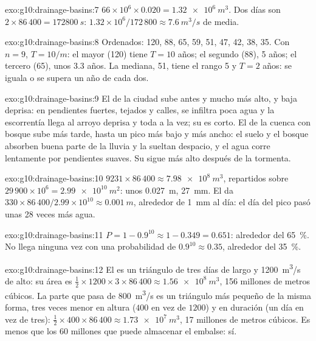 \begin{solution}{exo:g10:drainage-basins:7}
$66 \times 10^6 \times 0.020 = \qty{1.32e6}{m^3}$. Dos días son
$2 \times 86\,400 = \qty{172800}{s}$: $1.32 \times 10^6/172\,800 \approx
\qty{7.6}{m^3/s}$ de media.
\end{solution}

\begin{solution}{exo:g10:drainage-basins:8}
Ordenados: 120, 88, 65, 59, 51, 47, 42, 38, 35. Con $n = 9$, $T = 10/m$: el
mayor (120) tiene $T = 10$ años; el segundo (88), 5 años; el tercero (65),
unos 3.3 años. La mediana, 51, tiene el rango 5 y $T = 2$ años: se iguala o
se supera un año de cada dos.
\end{solution}

\begin{solution}{exo:g10:drainage-basins:9}
El  de la ciudad sube antes y mucho más alto, y baja deprisa: en
pendientes fuertes, tejados y calles, se infiltra poca agua y la escorrentía
llega al arroyo deprisa y toda a la vez; su  es corto. El
 de la cuenca con bosque sube más tarde, hasta un pico más bajo y
más ancho: el suelo y el bosque absorben buena parte de la lluvia y la
sueltan despacio, y el agua corre lentamente por pendientes suaves. Su  sigue más alto después de la tormenta.
\end{solution}

\begin{solution}{exo:g10:drainage-basins:10}
$9231 \times 86\,400 \approx \qty{7.98e8}{m^3}$, repartidos sobre
$29\,900 \times 10^6 = \qty{2.99e10}{m^2}$: unos \qty{0.027}{m},
\qty{27}{mm}. El  da $330 \times 86\,400/2.99 \times 10^{10}
\approx \qty{0.001}{m}$, alrededor de \qty{1}{mm} al día: el día del pico
pasó unas 28 veces más agua.
\end{solution}

\begin{solution}{exo:g10:drainage-basins:11}
$P = 1 - 0.9^{10} \approx 1 - 0.349 = 0.651$: alrededor del
\qty{65}{\percent}. No llega ninguna vez con una probabilidad de $0.9^{10} \approx 0.35$, alrededor del \qty{35}{\percent}.
\end{solution}

\begin{solution}{exo:g10:drainage-basins:12}
El  es un triángulo de tres días de largo y \qty{1200}{m^3/s} de
alto: su área es $\tfrac12 \times 1200 \times 3 \times 86\,400 \approx
\qty{1.56e8}{m^3}$, \num{156} millones de metros cúbicos. La parte que pasa
de \qty{800}{m^3/s} es un triángulo más pequeño de la misma forma, tres veces
menor en altura ($400$ en vez de $1200$) y en duración (un día en vez de
tres): $\tfrac12 \times 400 \times 86\,400 \approx \qty{1.73e7}{m^3}$,
\num{17} millones de metros cúbicos. Es menos que los \num{60} millones que
puede almacenar el embalse: sí.
\end{solution}

